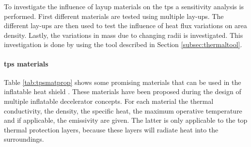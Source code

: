 To investigate the influence of layup materials on the \gls{tps} a sensitivity analysis is performed. First different materials are tested using multiple lay-ups. The different lay-ups are then used to test the influence of heat flux variations on area density. Lastly, the variations in mass due to changing radii is investigated. This investigation is done by using the tool described in Section \ref{subsec:thermaltool}.

\paragraph{\gls{tps} materials}
Table \ref{tab:tpsmatprop} shows some promising materials that can be used in the inflatable heat shield \cite{Corso2009,Corso2011,DuPont2011,Smith2011}. These materials have been proposed during the design of multiple inflatable decelerator concepts. For each material the thermal conductivity, the density, the specific heat, the maximum operative temperature and if applicable, the emissivity are given. The latter is only applicable to the top  thermal protection layers, because these layers will radiate heat into the surroundings.

